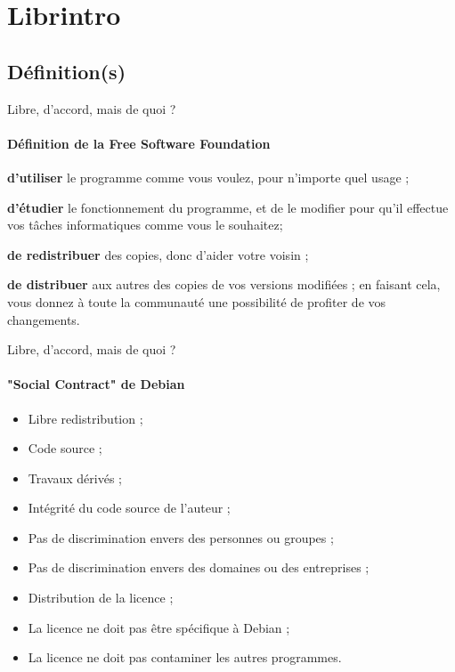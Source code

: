 \section{Librintro}
\subsection{Définition(s)}

\begin{frame}{Libre, d'accord, mais de quoi ?}
  \framesubtitle{Définition de la Free Software Foundation\footnotemark[1]}

  \begin{description}[<+->]
    \item[liberté 0] \small \textbf{d'utiliser} le programme comme vous voulez, pour n'importe quel usage ;
    \item[liberté 1] \small \alert<5>{\textbf{d'étudier} le fonctionnement du programme, et de le modifier pour qu'il effectue vos tâches informatiques comme vous le souhaitez\footnotemark[2] ;}
    \item[liberté 2] \small \textbf{de redistribuer} des copies, donc d'aider votre voisin ;
    \item[liberté 3] \small \alert<5>{\textbf{de distribuer} aux autres des copies de vos versions modifiées ; en faisant cela, vous donnez à toute la communauté une possibilité de profiter de vos changements\footnotemark[2].}
  \end{description}

  
\end{frame}

\begin{frame}{Libre, d'accord, mais de quoi ?}
  \framesubtitle{"Social Contract" de Debian\footnotemark[1]}

  \begin{itemize}\small
    \item Libre redistribution ;
    \item Code source ;
    \item Travaux dérivés ;
    \item Intégrité du code source de l'auteur ;
    \item Pas de discrimination envers des personnes ou groupes ;
    \item Pas de discrimination envers des domaines ou des entreprises ;
    \item Distribution de la licence ;
    \item La licence ne doit pas être spécifique à Debian ;
    \item La licence ne doit pas contaminer les autres programmes.
  \end{itemize}

\end{frame}

